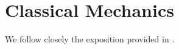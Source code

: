 \section*{Classical Mechanics}
We follow closely the exposition provided in \cite[4--61]{takhtajan:QM:2008}.
